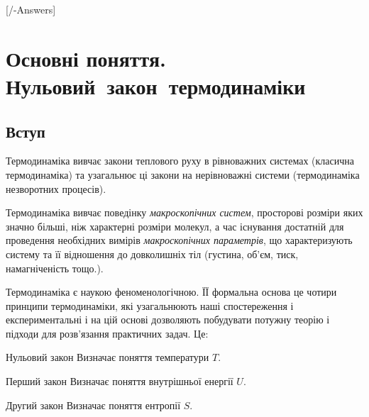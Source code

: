 
[\currfilebase/\currfilebase-Answers]
\chapter{Основні поняття. \mbox{Нульовий закон термодинаміки}}\label{\currfilebase}
\graphicspath{{\currfilebase/pictures}}
\makeatletter
{}
\makeatother

\section{Вступ}

Термодинаміка вивчає закони теплового руху в рівноважних системах (класична термодинаміка) та
узагальнює ці закони на нерівноважні системи (термодинаміка незворотних процесів).

Термодинаміка вивчає поведінку \emph{макроскопічних систем}, просторові розміри яких значно
більші, ніж
характерні розміри молекул, а час існування достатній для проведення необхідних вимірів
\emph{макроскопічних параметрів}, що характеризують систему та її відношення до довколишніх тіл
(густина, об'єм, тиск, намагніченість тощо.).

Термодинаміка є наукою феноменологічною. ЇЇ формальна основа це чотири принципи термодинаміки,
які узагальнюють наші спостереження і експериментальні і на цій основі дозволяють побудувати
потужну теорію і підходи для розв'язання практичних задач. Це:
\begin{thermolaw}{Нульовий закон}
Визначає поняття температури $T$.
\end{thermolaw}

\begin{thermolaw}{Перший закон}{}
Визначає поняття внутрішньої енергії $U$.
\end{thermolaw}

\begin{thermolaw}{Другий закон}
Визначає поняття ентропії $S$.
\end{thermolaw}


